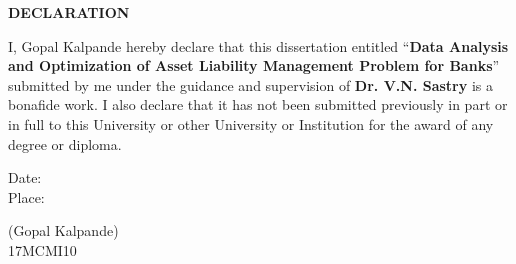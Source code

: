 \begin{center}
\textbf{\large DECLARATION}
\end{center}
\vspace{.50in}
I, Gopal Kalpande hereby declare that this dissertation entitled 
``\textbf{Data Analysis and Optimization of Asset Liability Management Problem for Banks}'' 
submitted by me under the guidance and supervision of \textbf{Dr. V.N. Sastry} is a bonafide work. 
I also declare that it has not been submitted previously in part or in full to this University or 
other University or Institution for the award of any degree or diploma.
\vspace{1in}

\noindent
\parbox[t]{3in}
{\raggedright
Date:\\
Place:\\
}
\parbox[t]{3in}
{
\raggedleft 
(Gopal Kalpande)\\
17MCMI10\\
}

